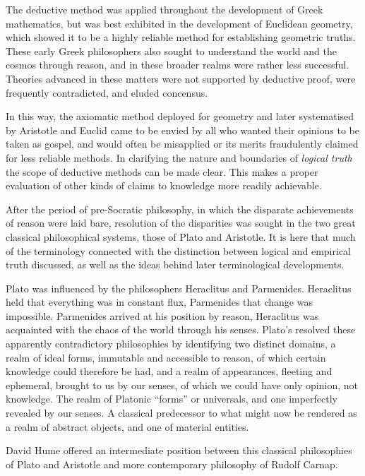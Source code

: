 \documentclass[10pt,titlepage]{article}
\begin{document}
The deductive method was applied throughout the development of Greek mathematics, but was best exhibited in the development of Euclidean geometry, which showed it to be a highly reliable method for establishing geometric truths.
These early Greek philosophers also sought to understand the world and the cosmos through reason, and in these broader realms were rather less successful.
Theories advanced in these matters were not supported by deductive proof, were frequently contradicted, and eluded concensus.

In this way, the axiomatic method deployed for geometry and later systematised by Aristotle and Euclid came to be envied by all who wanted their opinions to be taken as gospel, and would often be misapplied or its merits fraudulently claimed for less reliable methods.
In clarifying the nature and boundaries of \emph{logical truth} the scope of deductive methods can be made clear.
This makes a proper evaluation of other kinds of claims to knowledge more readily achievable.

After the period of pre-Socratic philosophy, in which the disparate achievements of reason were laid bare, resolution of the disparities was sought in the two great classical philosophical systems, those of Plato and Aristotle.
It is here that much of the terminology connected with the distinction between logical and empirical truth discussed, as well as the ideas behind later terminological developments.

Plato was influenced by the philosophers Heraclitus and Parmenides.
Heraclitus held that everything was in constant flux, Parmenides that change was impossible.
Parmenides arrived at his position by reason, Heraclitus was acquainted with the chaos of the world through his senses.
Plato's resolved these apparently contradictory philosophies by identifying two distinct domains, a realm of ideal forms, immutable and accessible to reason, of which certain knowledge could therefore be had, and a realm of appearances, fleeting and ephemeral, brought to us by our senses, of which we could have only opinion, not knowledge.
The realm of Platonic ``forms'' or universals, and one imperfectly revealed by our senses.
A classical predecessor to what might now be rendered as a realm of abstract objects, and one of material entities.

David Hume offered an intermediate position between this classical philosophies of Plato and Aristotle and more contemporary philosophy of Rudolf Carnap.
\end{document}
